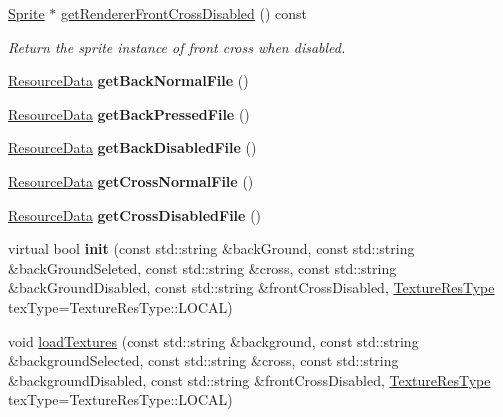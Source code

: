 \begin{DoxyCompactItemize}
\hyperlink{classSprite}{Sprite} $\ast$ \hyperlink{classui_1_1AbstractCheckButton_a6b8e3b669fd52665e7ec93157dd1de06}{get\+Renderer\+Front\+Cross\+Disabled} () const
\begin{DoxyCompactList}\small\item\em Return the sprite instance of front cross when disabled. \end{DoxyCompactList}\item 
\mbox{\label{classui_1_1AbstractCheckButton_aba382b9b74ffb88bdbd4f8c00f7a5d1c}} 
\hyperlink{structResourceData}{Resource\+Data} {\bfseries get\+Back\+Normal\+File} ()
\item 
\mbox{\label{classui_1_1AbstractCheckButton_afbcea517326a799204b9582012c521c1}} 
\hyperlink{structResourceData}{Resource\+Data} {\bfseries get\+Back\+Pressed\+File} ()
\item 
\mbox{\label{classui_1_1AbstractCheckButton_ae00e42578fbd5239ec65df273ffd3620}} 
\hyperlink{structResourceData}{Resource\+Data} {\bfseries get\+Back\+Disabled\+File} ()
\item 
\mbox{\label{classui_1_1AbstractCheckButton_aa66ceb33d302e5dd62b9c52f37746b56}} 
\hyperlink{structResourceData}{Resource\+Data} {\bfseries get\+Cross\+Normal\+File} ()
\item 
\mbox{\label{classui_1_1AbstractCheckButton_af186b693cf16e7ed1d80555cdf4a12f0}} 
\hyperlink{structResourceData}{Resource\+Data} {\bfseries get\+Cross\+Disabled\+File} ()
\item 
\mbox{\label{classui_1_1AbstractCheckButton_a627e16589a1041947055a0b7b4599071}} 
virtual bool {\bfseries init} (const std\+::string \&back\+Ground, const std\+::string \&back\+Ground\+Seleted, const std\+::string \&cross, const std\+::string \&back\+Ground\+Disabled, const std\+::string \&front\+Cross\+Disabled, \hyperlink{classui_1_1Widget_a040a65ec5ad3b11119b7e16b98bd9af0}{Texture\+Res\+Type} tex\+Type=Texture\+Res\+Type\+::\+L\+O\+C\+AL)
\item 
void \hyperlink{classui_1_1AbstractCheckButton_a4d375837cd83ff2008fffecf3a5ed1ac}{load\+Textures} (const std\+::string \&background, const std\+::string \&background\+Selected, const std\+::string \&cross, const std\+::string \&background\+Disabled, const std\+::string \&front\+Cross\+Disabled, \hyperlink{classui_1_1Widget_a040a65ec5ad3b11119b7e16b98bd9af0}{Texture\+Res\+Type} tex\+Type=Texture\+Res\+Type\+::\+L\+O\+C\+AL)

\end{DoxyCompactItemize}

